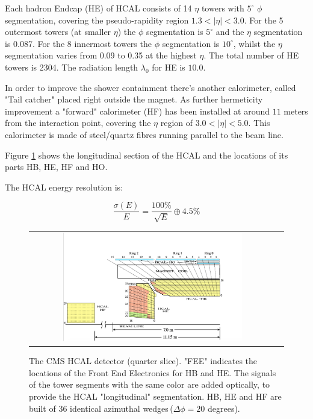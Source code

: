 Each hadron Endcap (HE) of HCAL consists of 14 $\eta$ towers with $5^{\circ}$ $\phi$ segmentation, covering the pseudo-rapidity region $1.3 < |\eta| < 3.0$. For the 5 outermost towers (at smaller $\eta$) the $\phi$ segmentation is $5^{\circ}$ and the $\eta$ segmentation is 0.087. For the 8 innermost towers the $\phi$ segmentation is $10^{\circ}$, whilst the $\eta$ segmentation varies from 0.09 to 0.35 at the highest $\eta$. The total number of HE towers is 2304. The radiation length $\lambda_{0}$ for HE is $10.0$.

In order to improve the shower containment there's another calorimeter, called "Tail catcher" placed right outside the magnet. As further hermeticity improvement a "forward" calorimeter (HF) has been installed at around $11$ meters from the interaction point, covering the $\eta$ region of $3.0 < |\eta| <5.0$. This calorimeter is made of steel/quartz fibres running parallel to the beam line.

Figure \ref{fig:HCAL_section} shows the longitudinal section of the HCAL and the locations of its parts HB, HE, HF and HO.

The HCAL energy resolution is:

\begin{equation}
\dfrac{\sigma(E)}{E} = \dfrac{100\%}{\sqrt{E}}\oplus 4.5\%
\end{equation}

\begin{figure}[tbh!]
	\centering
	\begin{tabular}{cc}
		\includegraphics[width=0.75\textwidth]{detector/pics/HCAL_section.png}
	\end{tabular}
	\caption{The CMS HCAL detector (quarter slice). "FEE" indicates the locations of the Front End Electronics for HB and HE. The signals of the tower segments with the same color are added optically, to provide the HCAL "longitudinal" segmentation. HB, HE and HF are built of 36 identical azimuthal wedges\,($\Delta\phi = 20$ degrees).}
	\label{fig:HCAL_section}
\end{figure}

